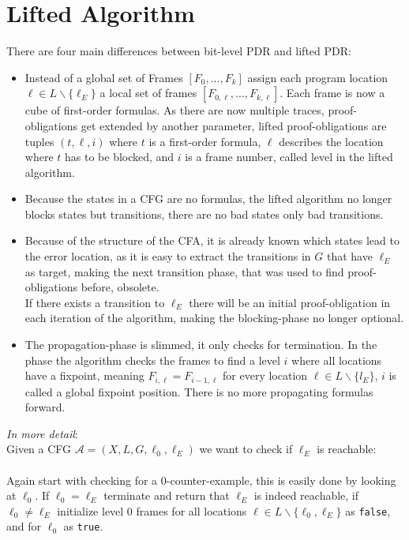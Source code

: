 \documentclass[11pt, a4paper, BCOR=10mm, ngerman, oneside]{scrbook}
\begin{document}
\section{Lifted Algorithm}
There are four main differences between bit-level PDR and lifted PDR:
\begin{itemize}

\item Instead of a global set of Frames $[F_0, ..., F_k]$ assign each program location $\ell \in L \backslash \{\ell_E\}$ a local set of frames $[F_{0, \ell}, ..., F_{k, \ell}]$. Each frame is now a cube of first-order formulas. As there are now multiple traces, proof-obligations get extended by another parameter, lifted proof-obligations are tuples $(t, \ell, i)$ where $t$ is a first-order formula, $\ell$ describes the location where $t$ has to be blocked, and $i$ is a frame number, called level in the lifted algorithm.

\item 
Because the states in a CFG are no formulas, the lifted algorithm no longer blocks states but transitions, there are no bad states only bad transitions.

\item Because of the structure of the CFA, it is already known which states lead to the error location, as it is easy to extract the transitions in $G$ that have $\ell_E$ as target, making the next transition phase, that was used to find proof-obligations before, obsolete. \\ If there exists a transition to $\ell_E$ there will be an initial proof-obligation in each iteration of the algorithm, making the blocking-phase no longer optional.

\item The propagation-phase is slimmed, it only checks for termination. In the phase the algorithm checks the frames to find a level $i$ where all locations have a fixpoint, meaning  $F_{i, \ell} = F_{i-1, \ell}$ for every location $\ell \in L \backslash \{l_E \}$, $i$ is called a global fixpoint position. There is no more propagating formulas forward.
\end{itemize}

\hspace*{5cm}

\textsl{In more detail}: \\
Given a CFG $\mathcal{A} = (X, L, G, \ell_0, \ell_E)$ we want to check if $\ell_E$ is reachable: \\ \\
Again start with checking for a 0-counter-example, this is easily done by looking at $\ell_0$. If $\ell_0 = \ell_E$ terminate and return that $\ell_E$ is indeed reachable, if $\ell_0 \neq \ell_E$ initialize level 0 frames for all locations $\ell \in L \backslash \{\ell_0, \ell_E\}$ as \texttt{false}, and for $\ell_0$ as \texttt{true}. \\ 
\end{document}
